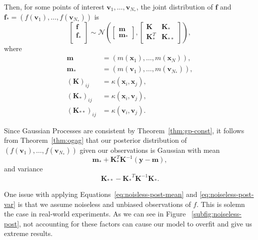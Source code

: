 Then, for some points of interest $\mathbf{v}_{1}, \ldots, \mathbf{v}_{N_{*}}$, the joint distribution of $\mathbf{f}$ and $\mathbf{f}_* = (f(\mathbf{v}_1), \ldots, f(\mathbf{v}_{N_*}))$ is
\begin{equation*}
    \begin{bmatrix}
        \mathbf{f} \\
        \mathbf{f}_{*} \\
    \end{bmatrix} \sim
    \mathcal{N}\left(
    \begin{bmatrix}
        \mathbf{m} \\ \mathbf{m}_{*}
    \end{bmatrix},
    \begin{bmatrix}
        \mathbf{K} & \mathbf{K}_* \\
        \mathbf{K}_*^T & \mathbf{K}_{* *}
    \end{bmatrix}\right),
\end{equation*}
where 
\begin{align*}
    \mathbf{m} &= (m(\mathbf{x}_1), \ldots, m(\mathbf{x}_N)), \\
    \mathbf{m_*} &= (m(\mathbf{v}_1), \ldots, m(\mathbf{v}_{N_{*}})), \\
    (\mathbf{K})_{ij} &= \kappa(\mathbf{x}_i, \mathbf{x}_j), \\
    (\mathbf{K}_*)_{ij} &= \kappa(\mathbf{x}_i, \mathbf{v}_j), \\
    (\mathbf{K}_{* *})_{ij} &= \kappa(\mathbf{v}_i, \mathbf{v}_j).
\end{align*}

Since Gaussian Processes are consistent by Theorem~\ref{thm:gp-const}, it follows from Theorem~\ref{thm:ogag} that our posterior distribution
of $(f(\mathbf{v}_1), \ldots, f(\mathbf{v}_{N_*}))$ given our observations is Gaussian with mean
\begin{equation} \label{eq:noisless-post-mean}
    \mathbf{m}_* + \mathbf{K}_*^T \mathbf{K}^{-1} (\mathbf{y} - \mathbf{m}), 
\end{equation}
and variance
\begin{equation} \label{eq:noiseless-post-var}
    \mathbf{K}_{* *} - \mathbf{K_*}^{T} \mathbf{K}^{-1} \mathbf{K_*}.
\end{equation}

One issue with applying Equations~\ref{eq:noisless-post-mean} and \ref{eq:noiseless-post-var} is that we assume noiseless and unbiased observations of $f$.
This is solemn the case in real-world experiments.
As we can see in Figure ~\ref{subfig:noiseless-post}, not accounting for these factors can cause our model to overfit and give us extreme results.

